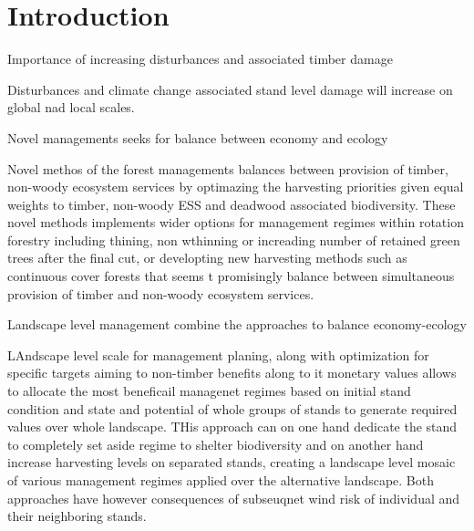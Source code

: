 \documentclass[]{elsarticle} %
\begin{document}
\begin{frontmatter}
\begin{abstract}
  Mean probability of wind damage slightly increased (CCF) or remained nearly constant (RF) with increasing harvest intensities. Stands under active RF had half of the wind risk probability compared to stands under CCF; wind risk of SA stands decreased with increasing harvest intensities (Figure 1A). Standing top stratum volume accumulated in SA stands within both CCF and RF landscapes and decreased with increasing harvest intensities. Top stratum timber volume was approximately 50\% higher in RF (µ=\textasciitilde150 m3) compared to landscape managed solely by CCF (µ=\textasciitilde100 m3), especially at low harvest intensity (Figure 1B).
  
  We conclude that when interpreting the risk of wind damage among management regimes, we need to take into account the standing timber volume exposed to risk in order to understand the potential economic loses.
  \end{abstract}
  
 \end{frontmatter}

\newpage

\hypertarget{introduction}{%
\section{Introduction}\label{introduction}}

Importance of increasing disturbances and associated timber damage

Disturbances and climate change associated stand level damage will increase on global nad local scales.

Novel managements seeks for balance between economy and ecology

Novel methos of the forest managements balances between provision of timber, non-woody ecosystem services by optimazing the harvesting priorities given equal weights to timber, non-woody ESS and deadwood associated biodiversity. These novel methods implements wider options for management regimes within rotation forestry including thining, non wthinning or increading number of retained green trees after the final cut, or developting new harvesting methods such as continuous cover forests that seems t promisingly balance between simultaneous provision of timber and non-woody ecosystem services.

Landscape level management combine the approaches to balance economy-ecology

LAndscape level scale for management planing, along with optimization for specific targets aiming to non-timber benefits along to it monetary values allows to allocate the most beneficail managenet regimes based on initial stand condition and state and potential of whole groups of stands to generate required values over whole landscape. THis approach can on one hand dedicate the stand to completely set aside regime to shelter biodiversity and on another hand increase harvesting levels on separated stands, creating a landscape level mosaic of various management regimes applied over the alternative landscape. Both approaches have however consequences of subseuqnet wind risk of individual and their neighboring stands.
\end{document}
